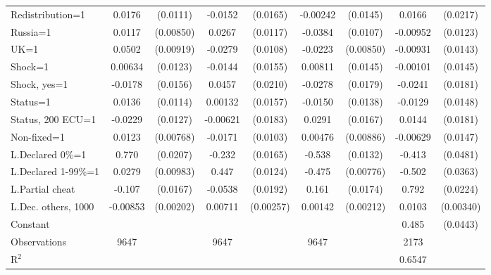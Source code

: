 \begin{tabular}{l|cccccc|cc}
Redistribution=1&   0.0176         & (0.0111)&  -0.0152         & (0.0165)& -0.00242         & (0.0145)&   0.0166         & (0.0217)\\
Russia=1        &   0.0117         &(0.00850)&   0.0267\sym{**} & (0.0117)&  -0.0384\sym{***}& (0.0107)& -0.00952         & (0.0123)\\
UK=1            &   0.0502\sym{***}&(0.00919)&  -0.0279\sym{**} & (0.0108)&  -0.0223\sym{***}&(0.00850)& -0.00931         & (0.0143)\\
Shock=1         &  0.00634         & (0.0123)&  -0.0144         & (0.0155)&  0.00811         & (0.0145)& -0.00101         & (0.0145)\\
Shock, yes=1    &  -0.0178         & (0.0156)&   0.0457\sym{**} & (0.0210)&  -0.0278         & (0.0179)&  -0.0241         & (0.0181)\\
Status=1        &   0.0136         & (0.0114)&  0.00132         & (0.0157)&  -0.0150         & (0.0138)&  -0.0129         & (0.0148)\\
Status, 200 ECU=1&  -0.0229\sym{*}  & (0.0127)& -0.00621         & (0.0183)&   0.0291\sym{*}  & (0.0167)&   0.0144         & (0.0181)\\
Non-fixed=1     &   0.0123         &(0.00768)&  -0.0171\sym{*}  & (0.0103)&  0.00476         &(0.00886)& -0.00629         & (0.0147)\\
L.Declared 0\%=1&    0.770\sym{***}& (0.0207)&   -0.232\sym{***}& (0.0165)&   -0.538\sym{***}& (0.0132)&   -0.413\sym{***}& (0.0481)\\
L.Declared 1-99\%=1&   0.0279\sym{***}&(0.00983)&    0.447\sym{***}& (0.0124)&   -0.475\sym{***}&(0.00776)&   -0.502\sym{***}& (0.0363)\\
L.Partial cheat &   -0.107\sym{***}& (0.0167)&  -0.0538\sym{***}& (0.0192)&    0.161\sym{***}& (0.0174)&    0.792\sym{***}& (0.0224)\\
L.Dec. others, 1000& -0.00853\sym{***}&(0.00202)&  0.00711\sym{***}&(0.00257)&  0.00142         &(0.00212)&   0.0103\sym{***}&(0.00340)\\
Constant        &                  &         &                  &         &                  &         &    0.485\sym{***}& (0.0443)\\
\hline
Observations    &     9647         &         &     9647         &         &     9647         &         &     2173         &         \\
R$^2$      &                  &         &                  &         &                  &         &    0.6547        &   \\ 

\end{tabular}
